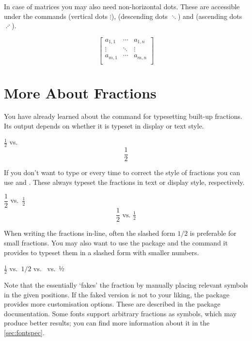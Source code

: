In case of matrices you may also need non-horizontal dots. These are accessible
under the commands  (vertical dots \(\vdots\)), 
(descending dots \(\ddots\)) and  (ascending dots \(\adots\)).
\begin{example}
\[ \begin{bmatrix}
  a_{1,1} & \cdots  & a_{1,n} \\
  \vdots  & \ddots & \vdots  \\
  a_{m,1} & \cdots  & a_{m,n} \\
\end{bmatrix} \]
\end{example}

\section{More About Fractions}\label{sec:fractions}

You have already learned about the  command for typesetting built-up
fractions. Its output depends on whether it is typeset in display or text
style.
\begin{example}
\(\frac{1}{2}\) vs.\
\[\frac{1}{2}\]
\end{example}

If you don't want to type  or  every time to
correct the style of fractions you can use \csi{tfrac} and \csi{dfrac}. These
always typeset the fractions in text or display style, respectively.
\begin{example}
\(\dfrac{1}{2}\) vs.\
\(\tfrac{1}{2}\)
\[\dfrac{1}{2}\text{ vs.\ }
  \tfrac{1}{2}\]
\end{example}

When writing the fractions in-line, often the slashed form \(1/2\) is
preferable for small fractions. You may also want to use the 
package and the \csi{sfrac} command it provides to typeset them in a slashed
form with smaller numbers.
\begin{example}
\(\frac{1}{2}\) vs.\ \(1/2\)
vs.\  vs.\ ½
\end{example}
Note that the  essentially \enquote*{fakes} the fraction by manually
placing relevant symbols in the given positions. If the faked version is not to
your liking, the package provides more customisation options. These are
described in the package documentation. Some fonts support arbitrary fractions
as symbols, which may produce better results; you can find more information
about it in the \autoref{sec:fontspec}.

